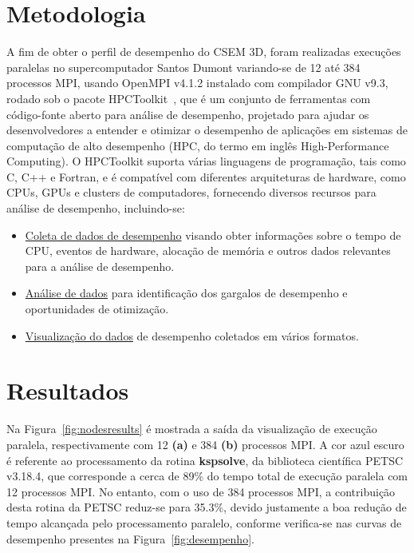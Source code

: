 \documentclass[12pt]{article}
\begin{document}
\section{Metodologia}
\label{sec:metodo}
%
A fim de obter o perfil de desempenho do CSEM 3D, foram realizadas execuções paralelas no supercomputador Santos Dumont variando-se de 12 até 384 processos MPI, usando OpenMPI v4.1.2 instalado com compilador GNU v9.3, rodado sob o pacote HPCToolkit~\cite{hpctoolkit2010}, que é um conjunto de ferramentas com código-fonte aberto para análise de desempenho, projetado para ajudar os desenvolvedores a entender e otimizar o desempenho de aplicações em sistemas de computação de alto desempenho (HPC, do termo em inglês High-Performance Computing). O HPCToolkit suporta várias linguagens de programação, tais como C, C++ e Fortran, e é compatível com diferentes arquiteturas de hardware, como CPUs, GPUs e clusters de computadores, fornecendo diversos recursos para análise de desempenho, incluindo-se:
\begin{itemize}
 \item \underline{Coleta de dados de desempenho} visando obter informações sobre o tempo de CPU, eventos de hardware, alocação de memória e outros dados relevantes para a análise de desempenho.
  \item \underline{Análise de dados} para identificação dos gargalos de desempenho e oportunidades de otimização.
 \item \underline{Visualização do dados} de desempenho coletados em vários formatos.
\end{itemize}

\section{Resultados}              
\label{sec:resultados}
Na Figura~\ref{fig:nodesresults} é mostrada a saída da visualização de execução paralela, respectivamente com 12 \textbf{(a)} e 384 \textbf{(b)} processos MPI. A cor azul escuro é referente ao processamento da rotina {\ttfamily \textbf{kspsolve}}, da biblioteca científica PETSC v3.18.4\cite{petsc-web-page,petsc-efficient}, que corresponde a cerca de 89\% do tempo total de execução paralela com 12 processos MPI. No entanto, com o uso de 384 processos MPI, a contribuição desta rotina da PETSC reduz-se para 35.3\%, devido justamente a boa redução de tempo alcançada pelo processamento paralelo, conforme verifica-se nas curvas de desempenho presentes na Figura~\ref{fig:desempenho}. 
\end{document}
